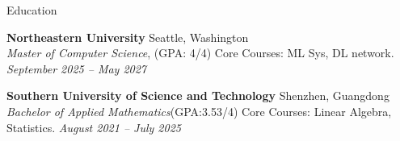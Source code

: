 \begin{rSection}{Education}
\setlength{\parskip}{1pt}
\setlength{\baselineskip}{12pt}

{\bf Northeastern University} \hfill Seattle, Washington \\
\textit{Master of Computer Science}, (GPA: 4/4) Core Courses:  ML Sys, DL network. \hfill \textit{September 2025 – May 2027}

{\bf Southern University of Science and Technology} \hfill Shenzhen, Guangdong \\
\textit{Bachelor of Applied Mathematics}(GPA:3.53/4) Core Courses: Linear Algebra, Statistics.  \hfill \textit{August 2021 – July 2025}



\end{rSection}




